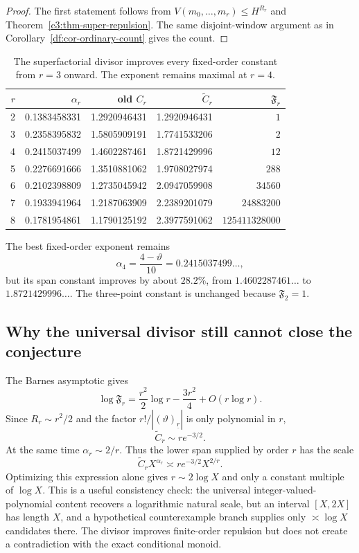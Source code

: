 \documentclass[11pt,oneside]{article}
\theoremstyle{definition}
\theoremstyle{remark}
\newcommand{\thetaq}{\vartheta}
\newcommand{\fall}[2]{\left(#1\right)_{\!\underline{#2}}}
\newcommand{\SF}[1]{\mathfrak F_{#1}}
\begin{document}
\begin{proof}
The first statement follows from
$V(m_0,\ldots,m_r)\le H^{R_r}$ and
Theorem~\ref{c3:thm-super-repulsion}.  The same disjoint-window argument as in
Corollary~\ref{df:cor-ordinary-count} gives the count.
\end{proof}

\begin{table}[ht]
\centering
\small
\begin{tabular}{rrrrr}
\toprule
$r$ & $\alpha_r$ & old $C_r$ & $\widetilde C_r$ & $\SF{r}$ \\
\midrule
2 & 0.1383458331 & 1.2920946431 & 1.2920946431 & $1$ \\
3 & 0.2358395832 & 1.5805909191 & 1.7741533206 & $2$ \\
4 & 0.2415037499 & 1.4602287461 & 1.8721429996 & $12$ \\
5 & 0.2276691666 & 1.3510881062 & 1.9708027974 & $288$ \\
6 & 0.2102398809 & 1.2735045942 & 2.0947059908 & $34560$ \\
7 & 0.1933941964 & 1.2187063909 & 2.2389201079 & $24883200$ \\
8 & 0.1781954861 & 1.1790125192 & 2.3977591062 & $125411328000$ \\
\bottomrule
\end{tabular}
\caption{The superfactorial divisor improves every fixed-order constant from $r=3$ onward.
The exponent remains maximal at $r=4$.}
\label{c3:tab-superconstants}
\end{table}

The best fixed-order exponent remains
\[
 \alpha_4=\frac{4-\thetaq}{10}=0.2415037499\ldots,
\]
but its span constant improves by about $28.2\%$, from $1.4602287461\ldots$ to
$1.8721429996\ldots$.  The three-point constant is unchanged because $\SF{2}=1$.

\subsection{Why the universal divisor still cannot close the conjecture}

The Barnes asymptotic gives
\begin{equation}
 \log\SF{r}
 =\frac{r^2}{2}\log r-\frac{3r^2}{4}+O(r\log r).
 \label{c3:eq-barnes-asymp}
\end{equation}
Since $R_r\sim r^2/2$ and the factor
$r!/|\fall{\thetaq}{r}|$ is only polynomial in $r$,
\begin{equation}
 \widetilde C_r\sim r e^{-3/2}.
 \label{c3:eq-Ctilde-asymp}
\end{equation}
At the same time $\alpha_r\sim2/r$.  Thus the lower span supplied by order $r$ has the scale
\[
 \widetilde C_rX^{\alpha_r}
 \asymp r e^{-3/2}X^{2/r}.
\]
Optimizing this expression alone gives $r\sim2\log X$ and only a constant multiple of
$\log X$.  This is a useful consistency check: the universal integer-valued-polynomial
content recovers a logarithmic natural scale, but an interval $[X,2X]$ has length $X$, and a
hypothetical counterexample branch supplies only $\asymp\log X$ candidates there.  The
divisor improves finite-order repulsion but does not create a contradiction with the exact
conditional monoid.
\end{document}
